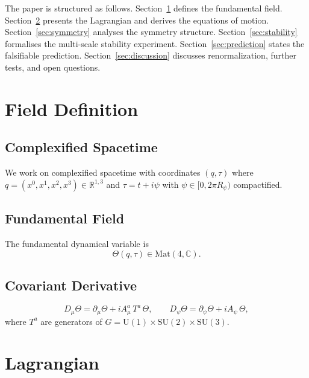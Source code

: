 \documentclass[12pt,a4paper]{article}
\newcommand{\C}{\mathbb{C}}
\begin{document}
The paper is structured as follows.
Section~\ref{sec:field} defines the fundamental field.
Section~\ref{sec:lagrangian} presents the Lagrangian and derives the equations of
motion.
Section~\ref{sec:symmetry} analyses the symmetry structure.
Section~\ref{sec:stability} formalises the multi-scale stability experiment.
Section~\ref{sec:prediction} states the falsifiable prediction.
Section~\ref{sec:discussion} discusses renormalization, further tests, and
open questions.

\section{Field Definition}
\label{sec:field}

\subsection{Complexified Spacetime}

We work on complexified spacetime with coordinates $(q,\tau)$ where
$q=(x^0,x^1,x^2,x^3)\in\mathbb{R}^{1,3}$ and $\tau = t + i\psi$ with
$\psi\in[0,2\pi R_\psi)$ compactified.

\subsection{Fundamental Field}

The fundamental dynamical variable is
\begin{equation}
  \Theta(q,\tau)\in\mathrm{Mat}(4,\C).
  \label{eq:theta_def}
\end{equation}

\subsection{Covariant Derivative}

\begin{equation}
  D_\mu\Theta = \partial_\mu\Theta + i A_\mu^a\,T^a\,\Theta,
  \qquad
  D_\psi\Theta = \partial_\psi\Theta + i A_\psi\,\Theta,
  \label{eq:cov_deriv}
\end{equation}
where $T^a$ are generators of
$G=\mathrm{U}(1)\times\mathrm{SU}(2)\times\mathrm{SU}(3)$.

\section{Lagrangian}
\label{sec:lagrangian}
\end{document}
